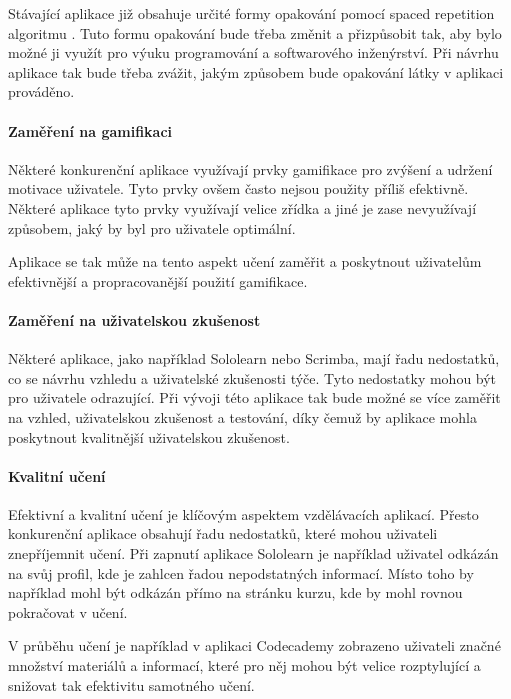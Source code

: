 Stávající aplikace již obsahuje určité formy opakování pomocí spaced repetition algoritmu \cite{Hlavac2024BachelorThesis}. Tuto formu opakování bude třeba změnit a přizpůsobit tak, aby bylo možné ji využít pro výuku programování a softwarového inženýrství. Při návrhu aplikace tak bude třeba zvážit, jakým způsobem bude opakování látky v aplikaci prováděno.

\paragraph{Zaměření na gamifikaci}

Některé konkurenční aplikace využívají prvky gamifikace pro zvýšení a udržení motivace uživatele. Tyto prvky ovšem často nejsou použity příliš efektivně. Některé aplikace tyto prvky využívají velice zřídka a jiné je zase nevyužívají způsobem, jaký by byl pro uživatele optimální.

Aplikace se tak může na tento aspekt učení zaměřit a poskytnout uživatelům efektivnější a propracovanější použití gamifikace.

\paragraph{Zaměření na uživatelskou zkušenost}

Některé aplikace, jako například Sololearn nebo Scrimba, mají řadu nedostatků, co se návrhu vzhledu a uživatelské zkušenosti týče. Tyto nedostatky mohou být pro uživatele odrazující. Při vývoji této aplikace tak bude možné se více zaměřit na vzhled, uživatelskou zkušenost a testování, díky čemuž by aplikace mohla poskytnout kvalitnější uživatelskou zkušenost.

\paragraph{Kvalitní učení}

Efektivní a kvalitní učení je klíčovým aspektem vzdělávacích aplikací. Přesto konkurenční aplikace obsahují řadu nedostatků, které mohou uživateli znepříjemnit učení. Při zapnutí aplikace Sololearn je například uživatel odkázán na svůj profil, kde je zahlcen řadou nepodstatných informací. Místo toho by například mohl být odkázán přímo na stránku kurzu, kde by mohl rovnou pokračovat v učení.

V průběhu učení je například v aplikaci Codecademy zobrazeno uživateli značné množství materiálů a informací, které pro něj mohou být velice rozptylující a snižovat tak efektivitu samotného učení.

